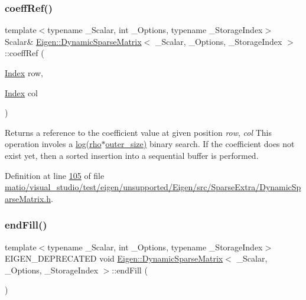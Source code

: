\subsubsection{\texorpdfstring{coeff\+Ref()}{coeffRef()}\hspace{0.1cm}{\footnotesize\ttfamily [2/2]}}
{\footnotesize\ttfamily template$<$typename \+\_\+\+Scalar, int \+\_\+\+Options, typename \+\_\+\+Storage\+Index$>$ \\
Scalar\& \hyperlink{class_eigen_1_1_dynamic_sparse_matrix}{Eigen\+::\+Dynamic\+Sparse\+Matrix}$<$ \+\_\+\+Scalar, \+\_\+\+Options, \+\_\+\+Storage\+Index $>$\+::coeff\+Ref (\begin{DoxyParamCaption}\item[{\hyperlink{group___core___module_a554f30542cc2316add4b1ea0a492ff02}{Index}}]{row,  }\item[{\hyperlink{group___core___module_a554f30542cc2316add4b1ea0a492ff02}{Index}}]{col }\end{DoxyParamCaption})\hspace{0.3cm}{\ttfamily [inline]}}

\begin{DoxyReturn}{Returns}
a reference to the coefficient value at given position {\itshape row}, {\itshape col} This operation involes a \hyperlink{structlog}{log(rho$\ast$outer\+\_\+size)} binary search. If the coefficient does not exist yet, then a sorted insertion into a sequential buffer is performed. 
\end{DoxyReturn}


Definition at line \hyperlink{matio_2visual__studio_2test_2eigen_2unsupported_2_eigen_2src_2_sparse_extra_2_dynamic_sparse_matrix_8h_source_l00105}{105} of file \hyperlink{matio_2visual__studio_2test_2eigen_2unsupported_2_eigen_2src_2_sparse_extra_2_dynamic_sparse_matrix_8h_source}{matio/visual\+\_\+studio/test/eigen/unsupported/\+Eigen/src/\+Sparse\+Extra/\+Dynamic\+Sparse\+Matrix.\+h}.

\mbox{\label{class_eigen_1_1_dynamic_sparse_matrix_aa806b3dde0a055844110610907b016f3}} 
\subsubsection{\texorpdfstring{end\+Fill()}{endFill()}\hspace{0.1cm}{\footnotesize\ttfamily [1/2]}}
{\footnotesize\ttfamily template$<$typename \+\_\+\+Scalar, int \+\_\+\+Options, typename \+\_\+\+Storage\+Index$>$ \\
E\+I\+G\+E\+N\+\_\+\+D\+E\+P\+R\+E\+C\+A\+T\+ED void \hyperlink{class_eigen_1_1_dynamic_sparse_matrix}{Eigen\+::\+Dynamic\+Sparse\+Matrix}$<$ \+\_\+\+Scalar, \+\_\+\+Options, \+\_\+\+Storage\+Index $>$\+::end\+Fill (\begin{DoxyParamCaption}{ }\end{DoxyParamCaption})\hspace{0.3cm}{\ttfamily [inline]}}

